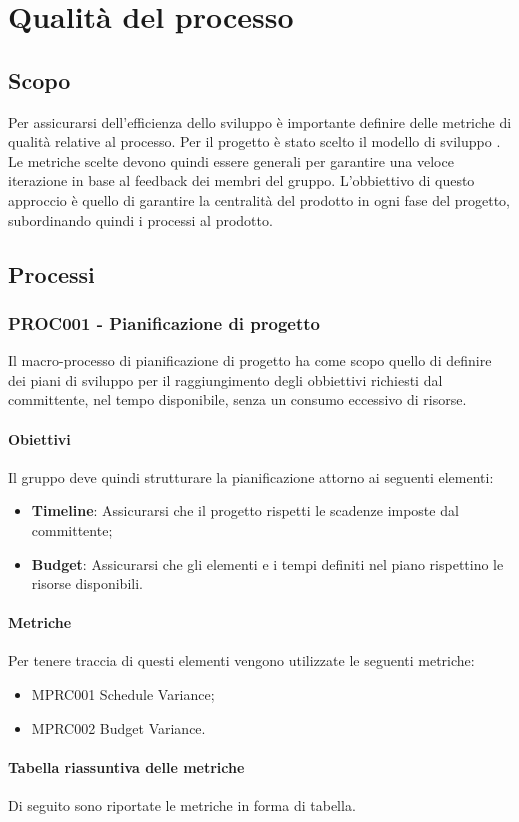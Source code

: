 \section{Qualità del processo}

\subsection{Scopo}
Per assicurarsi dell'efficienza dello sviluppo è importante definire delle metriche di qualità relative al processo.
Per il progetto è stato scelto il modello di sviluppo .
Le metriche scelte devono quindi essere generali per garantire una veloce iterazione in base al feedback dei membri del gruppo.
L'obbiettivo di questo approccio è quello di garantire la centralità del prodotto in ogni fase del progetto, subordinando quindi i processi al prodotto.

\subsection{Processi}

\subsubsection{PROC001 - Pianificazione di progetto}
Il macro-processo di pianificazione di progetto ha come scopo quello di definire dei piani di sviluppo per il raggiungimento degli obbiettivi richiesti dal committente, nel tempo disponibile, senza un consumo eccessivo di risorse.

\paragraph{Obiettivi}
Il gruppo deve quindi strutturare la pianificazione attorno ai seguenti elementi:
\begin{itemize}
\item \textbf{Timeline}: Assicurarsi che il progetto rispetti le scadenze imposte dal committente;
\item \textbf{Budget}: Assicurarsi che gli elementi e i tempi definiti nel piano rispettino le risorse disponibili.
\end{itemize}

\paragraph{Metriche}%
Per tenere traccia di questi elementi vengono utilizzate le seguenti metriche:
\begin{itemize}
\item MPRC001 Schedule Variance;
\item MPRC002 Budget Variance.
\end{itemize}

\paragraph{Tabella riassuntiva delle metriche}%
Di seguito sono riportate le metriche in forma di tabella.



